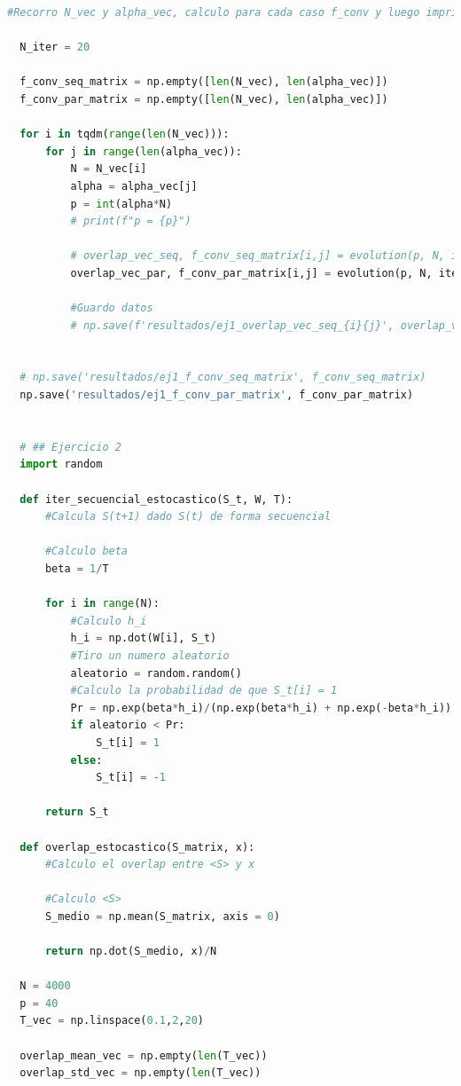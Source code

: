 \documentclass[aps,prb,twocolumn,superscriptaddress,floatfix,longbibliography]{revtex4-2}
\newcounter{para}
\begin{document}
\begin{lstlisting}[language=Python]
  #Recorro N_vec y alpha_vec, calculo para cada caso f_conv y luego imprimo todos los valores en una tabla
  
  N_iter = 20
  
  f_conv_seq_matrix = np.empty([len(N_vec), len(alpha_vec)])
  f_conv_par_matrix = np.empty([len(N_vec), len(alpha_vec)])
  
  for i in tqdm(range(len(N_vec))):
      for j in range(len(alpha_vec)):
          N = N_vec[i]
          alpha = alpha_vec[j]
          p = int(alpha*N)
          # print(f"p = {p}")
  
          # overlap_vec_seq, f_conv_seq_matrix[i,j] = evolution(p, N, iter_secuencial_determinista, overlap_determinista, N_iter = N_iter, calculate_all=False)
          overlap_vec_par, f_conv_par_matrix[i,j] = evolution(p, N, iter_paralelo_determinista, overlap_determinista, N_iter = N_iter, calculate_all=False)
          
          #Guardo datos
          # np.save(f'resultados/ej1_overlap_vec_seq_{i}{j}', overlap_vec_seq)
  
  
  # np.save('resultados/ej1_f_conv_seq_matrix', f_conv_seq_matrix)
  np.save('resultados/ej1_f_conv_par_matrix', f_conv_par_matrix)
     
  
  # ## Ejercicio 2
  import random
  
  def iter_secuencial_estocastico(S_t, W, T):
      #Calcula S(t+1) dado S(t) de forma secuencial
  
      #Calculo beta
      beta = 1/T
  
      for i in range(N):
          #Calculo h_i
          h_i = np.dot(W[i], S_t)
          #Tiro un numero aleatorio
          aleatorio = random.random()
          #Calculo la probabilidad de que S_t[i] = 1
          Pr = np.exp(beta*h_i)/(np.exp(beta*h_i) + np.exp(-beta*h_i))
          if aleatorio < Pr:
              S_t[i] = 1
          else:
              S_t[i] = -1
  
      return S_t
  
  def overlap_estocastico(S_matrix, x):
      #Calculo el overlap entre <S> y x
  
      #Calculo <S>
      S_medio = np.mean(S_matrix, axis = 0)
  
      return np.dot(S_medio, x)/N
  
  N = 4000
  p = 40
  T_vec = np.linspace(0.1,2,20)
  
  overlap_mean_vec = np.empty(len(T_vec))
  overlap_std_vec = np.empty(len(T_vec))
  

\end{lstlisting}
\end{document}
